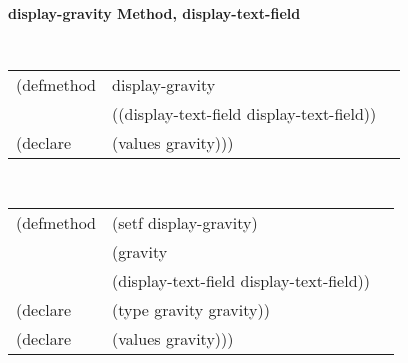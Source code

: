 %
%
%
%



{\samepage  
{\large {\bf display-gravity \hfill Method, display-text-field}}
\begin{flushright} \parbox[t]{6.125in}{
\tt
\begin{tabular}{lll}
\raggedright
(defmethod & display-gravity & \\
& ((display-text-field  display-text-field)) \\
(declare & (values gravity)))
\end{tabular}
\rm

}\end{flushright}}

\begin{flushright} \parbox[t]{6.125in}{
\tt
\begin{tabular}{lll}
\raggedright
(defmethod & (setf display-gravity) & \\
         & (gravity \\
         & (display-text-field  display-text-field)) \\
(declare &(type gravity  gravity))\\
(declare & (values gravity)))
\end{tabular}
\rm}
\end{flushright}

